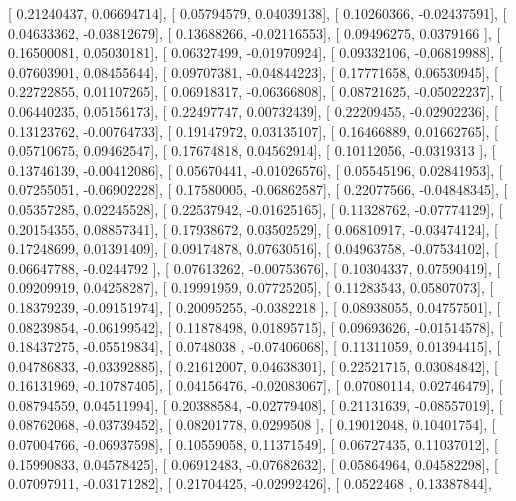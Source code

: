 \documentclass{article}
\begin{document}
       [ 0.21240437,  0.06694714],
       [ 0.05794579,  0.04039138],
       [ 0.10260366, -0.02437591],
       [ 0.04633362, -0.03812679],
       [ 0.13688266, -0.02116553],
       [ 0.09496275,  0.0379166 ],
       [ 0.16500081,  0.05030181],
       [ 0.06327499, -0.01970924],
       [ 0.09332106, -0.06819988],
       [ 0.07603901,  0.08455644],
       [ 0.09707381, -0.04844223],
       [ 0.17771658,  0.06530945],
       [ 0.22722855,  0.01107265],
       [ 0.06918317, -0.06366808],
       [ 0.08721625, -0.05022237],
       [ 0.06440235,  0.05156173],
       [ 0.22497747,  0.00732439],
       [ 0.22209455, -0.02902236],
       [ 0.13123762, -0.00764733],
       [ 0.19147972,  0.03135107],
       [ 0.16466889,  0.01662765],
       [ 0.05710675,  0.09462547],
       [ 0.17674818,  0.04562914],
       [ 0.10112056, -0.0319313 ],
       [ 0.13746139, -0.00412086],
       [ 0.05670441, -0.01026576],
       [ 0.05545196,  0.02841953],
       [ 0.07255051, -0.06902228],
       [ 0.17580005, -0.06862587],
       [ 0.22077566, -0.04848345],
       [ 0.05357285,  0.02245528],
       [ 0.22537942, -0.01625165],
       [ 0.11328762, -0.07774129],
       [ 0.20154355,  0.08857341],
       [ 0.17938672,  0.03502529],
       [ 0.06810917, -0.03474124],
       [ 0.17248699,  0.01391409],
       [ 0.09174878,  0.07630516],
       [ 0.04963758, -0.07534102],
       [ 0.06647788, -0.0244792 ],
       [ 0.07613262, -0.00753676],
       [ 0.10304337,  0.07590419],
       [ 0.09209919,  0.04258287],
       [ 0.19991959,  0.07725205],
       [ 0.11283543,  0.05807073],
       [ 0.18379239, -0.09151974],
       [ 0.20095255, -0.0382218 ],
       [ 0.08938055,  0.04757501],
       [ 0.08239854, -0.06199542],
       [ 0.11878498,  0.01895715],
       [ 0.09693626, -0.01514578],
       [ 0.18437275, -0.05519834],
       [ 0.0748038 , -0.07406068],
       [ 0.11311059,  0.01394415],
       [ 0.04786833, -0.03392885],
       [ 0.21612007,  0.04638301],
       [ 0.22521715,  0.03084842],
       [ 0.16131969, -0.10787405],
       [ 0.04156476, -0.02083067],
       [ 0.07080114,  0.02746479],
       [ 0.08794559,  0.04511994],
       [ 0.20388584, -0.02779408],
       [ 0.21131639, -0.08557019],
       [ 0.08762068, -0.03739452],
       [ 0.08201778,  0.0299508 ],
       [ 0.19012048,  0.10401754],
       [ 0.07004766, -0.06937598],
       [ 0.10559058,  0.11371549],
       [ 0.06727435,  0.11037012],
       [ 0.15990833,  0.04578425],
       [ 0.06912483, -0.07682632],
       [ 0.05864964,  0.04582298],
       [ 0.07097911, -0.03171282],
       [ 0.21704425, -0.02992426],
       [ 0.0522468 ,  0.13387844],
\end{document}

